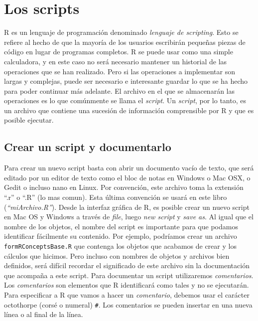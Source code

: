 \documentclass[
]{book}
\begin{document}
\hypertarget{los-scripts}{%
\section{Los scripts}\label{los-scripts}}

R es un lenguaje de programación denominado \emph{lenguaje de scripting}. Esto se refiere al hecho de que la mayoría de los usuarios escribirán pequeñas piezas de código en lugar de programas completos. R se puede usar como una simple calculadora, y en este caso no será necesario mantener un historial de las operaciones que se han realizado. Pero si las operaciones a implementar son largas y complejas, puede ser necesario e interesante guardar lo que se ha hecho para poder continuar más adelante. El archivo en el que se almacenarán las operaciones es lo que comúnmente se llama el \emph{script}. Un \emph{script}, por lo tanto, es un archivo que contiene una sucesión de información comprensible por R y que es posible ejecutar.

\hypertarget{crear-un-script-y-documentarlo}{%
\subsection{Crear un script y documentarlo}\label{crear-un-script-y-documentarlo}}

Para crear un nuevo script basta con abrir un documento vacío de texto, que será editado por un editor de texto como el bloc de notas en Windows o Mac OSX, o Gedit o incluso nano en Linux. Por convención, este archivo toma la extensión ``.r'' o ``.R'' (lo mas comun). Esta última convención se usará en este libro (\emph{``miArchivo.R''}). Desde la interfaz gráfica de R, es posible crear un nuevo script en Mac OS y Windows a través de \emph{file}, luego \emph{new script} y \emph{save as}.
Al igual que el nombre de los objetos, el nombre del script es importante para que podamos identificar fácilmente su contenido. Por ejemplo, podríamos crear un archivo \texttt{formRConceptsBase.R} que contenga los objetos que acabamos de crear y los cálculos que hicimos. Pero incluso con nombres de objetos y archivos bien definidos, será difícil recordar el significado de este archivo sin la documentación que acompaña a este script. Para documentar un script utilizaremos \emph{comentarios}. Los \emph{comentarios} son elementos que R identificará como tales y no se ejecutarán. Para especificar a R que vamos a hacer un \emph{comentario}, debemos usar el carácter octothorpe (corsé o numeral) \texttt{\#}. Los comentarios se pueden insertar en una nueva línea o al final de la línea.
\end{document}
